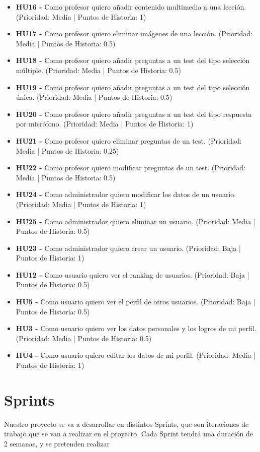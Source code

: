 \begin{itemize}
    \item \textbf{HU16 - } Como profesor quiero añadir contenido multimedia a una lección. (Prioridad: Media | Puntos de Historia: 1)
    \item \textbf{HU17 - } Como profesor quiero eliminar imágenes de una lección. (Prioridad: Media | Puntos de Historia: 0.5)
    \item \textbf{HU18 - } Como profesor quiero añadir preguntas a un test del tipo selección múltiple. (Prioridad: Media | Puntos de Historia: 0.5)
    \item \textbf{HU19 - } Como profesor quiero añadir preguntas a un test del tipo selección única. (Prioridad: Media | Puntos de Historia: 0.5)
    \item \textbf{HU20 - } Como profesor quiero añadir preguntas a un test del tipo respuesta por micrófono. (Prioridad: Media | Puntos de Historia: 1)
    \item \textbf{HU21 - } Como profesor quiero eliminar preguntas de un test. (Prioridad: Media | Puntos de Historia: 0.25)
    \item \textbf{HU22 - } Como profesor quiero modificar preguntas de un test. (Prioridad: Media | Puntos de Historia: 0.5)
    \item \textbf{HU24 - } Como administrador quiero modificar los datos de un usuario. (Prioridad: Media | Puntos de Historia: 1)
    \item \textbf{HU25 - } Como administrador quiero eliminar un usuario. (Prioridad: Media | Puntos de Historia: 0.5)
    \item \textbf{HU23 - } Como administrador quiero crear un usuario. (Prioridad: Baja | Puntos de Historia: 1)
    \item \textbf{HU12 - } Como usuario quiero ver el ranking de usuarios. (Prioridad: Baja | Puntos de Historia: 0.5)
    \item \textbf{HU5 - } Como usuario quiero ver el perfil de otros usuarios.  (Prioridad: Baja | Puntos de Historia: 0.5)
    \item \textbf{HU3 - } Como usuario quiero ver los datos personales y los logros de mi perfil. (Prioridad: Media | Puntos de Historia: 0.5)
    \item \textbf{HU4 - } Como usuario quiero editar los datos de mi perfil. (Prioridad: Media | Puntos de Historia: 1)


\end{itemize}

\section{Sprints}
Nuestro proyecto se va a desarrollar en distintos Sprints, que son iteraciones de trabajo que se van a realizar en el proyecto.
Cada Sprint tendrá una duración de 2 semanas, y se pretenden realizar
